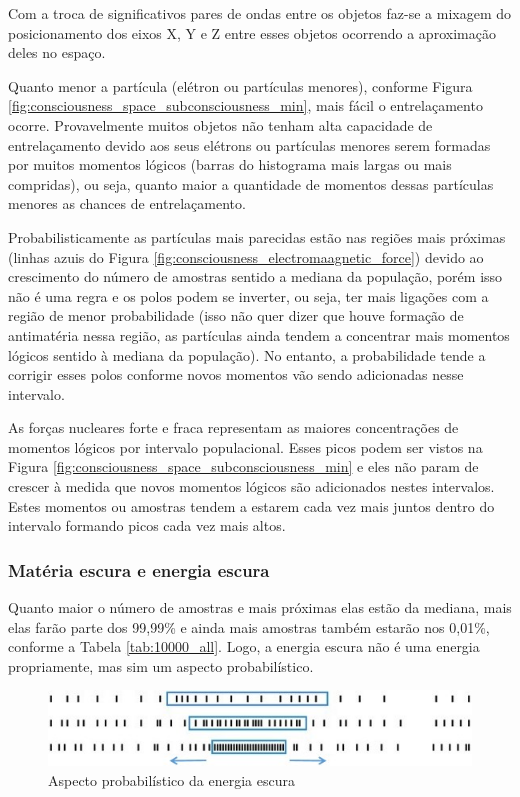 Com a troca de significativos pares de ondas entre os objetos faz-se a mixagem do posicionamento dos eixos X, Y e Z entre esses objetos ocorrendo a aproximação deles no espaço. 

Quanto menor a partícula (elétron ou partículas menores), conforme Figura \ref{fig:consciousness_space_subconsciousness_min}, mais fácil o entrelaçamento ocorre. Provavelmente muitos objetos não tenham alta capacidade de entrelaçamento devido aos seus elétrons ou partículas menores serem formadas por muitos momentos lógicos (barras do histograma mais largas ou mais compridas), ou seja, quanto maior a quantidade de momentos dessas partículas menores as chances de entrelaçamento.

Probabilisticamente as partículas mais parecidas estão nas regiões mais próximas (linhas azuis do Figura \ref{fig:consciousness_electromaagnetic_force}) devido ao crescimento do número de amostras sentido a mediana da população, porém isso não é uma regra e os polos podem se inverter, ou seja, ter mais ligações com a região de menor probabilidade (isso não quer dizer que houve formação de antimatéria nessa região, as partículas ainda tendem a concentrar mais momentos lógicos sentido à mediana da população). No entanto, a probabilidade tende a corrigir esses polos conforme novos momentos vão sendo adicionadas nesse intervalo.

As forças nucleares forte e fraca representam as maiores concentrações de momentos lógicos por intervalo populacional. Esses picos podem ser vistos na Figura \ref{fig:consciousness_space_subconsciousness_min} e eles não param de crescer à medida que novos momentos lógicos são adicionados nestes intervalos. Estes momentos ou amostras tendem a estarem cada vez mais juntos dentro do intervalo formando picos cada vez mais altos.

\subsubsection{Matéria escura e energia escura}
Quanto maior o número de amostras e mais próximas elas estão da mediana, mais elas farão parte dos 99,99\% e ainda mais amostras também estarão nos 0,01\%, conforme a Tabela \ref{tab:10000_all}. Logo, a energia escura não é uma energia propriamente, mas sim um aspecto probabilístico. 
	\begin{figure}[H]
	\caption{Aspecto probabilístico da energia escura}
	\label{fig:consciousness_dark_matter_dark_energy}
	\centering
	\includegraphics[scale=.9]{sections/images/consciousness_dark_matter_dark_energy.jpg}
	\end{figure}

